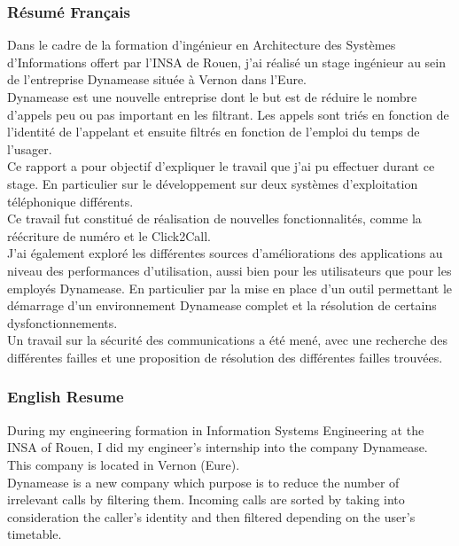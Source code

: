 \thispagestyle{empty}


\subsubsection{Résumé Français}

Dans le cadre de la formation d'ingénieur en Architecture des Systèmes d'Informations offert par l'INSA de Rouen, j'ai réalisé un stage ingénieur au sein de l'entreprise Dynamease située à Vernon dans l'Eure.\\

Dynamease est une nouvelle entreprise dont le but est de réduire le nombre d’appels peu ou pas important en les filtrant. Les appels sont triés en fonction de l’identité de l’appelant et ensuite filtrés en fonction de l’emploi du temps de l’usager.\\

Ce rapport a pour objectif d'expliquer le travail que j'ai pu effectuer durant ce stage. En particulier sur le développement sur deux systèmes d'exploitation téléphonique différents.\\

Ce travail fut constitué de réalisation de nouvelles fonctionnalités, comme la réécriture de numéro et le Click2Call.\\

J'ai également exploré les différentes sources d'améliorations des applications au niveau des performances d'utilisation, aussi bien pour les utilisateurs que pour les employés Dynamease. En particulier par la mise en place d'un outil permettant le démarrage d'un environnement Dynamease complet et la résolution de certains dysfonctionnements.\\

Un travail sur la sécurité des communications a été mené, avec une recherche des différentes failles et une proposition de résolution des différentes failles trouvées.\\


\subsubsection{English Resume}

During my engineering formation in Information Systems Engineering at the INSA of Rouen, I did my engineer's internship into the company Dynamease. This company is located in Vernon (Eure).\\

Dynamease is a new company which purpose is to reduce the number of irrelevant calls by filtering them. Incoming calls are sorted by taking into consideration the caller’s identity and then filtered depending on the user’s timetable.\\

